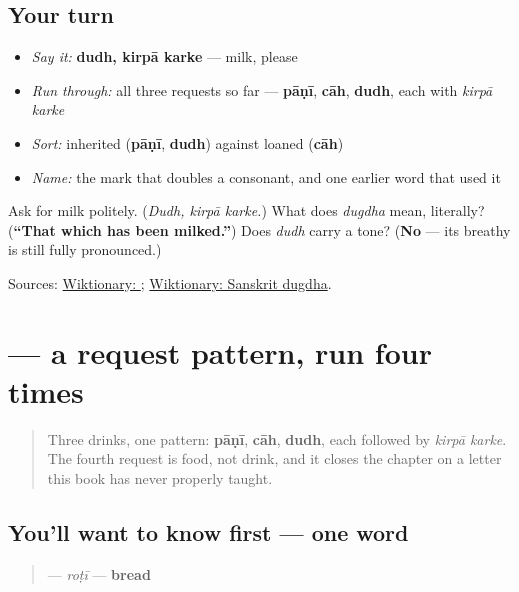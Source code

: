 \subsection*{Your turn}
\begin{itemize}
\raggedright
  \item \emph{Say it:} \textbf{dudh, kirpā karke} — milk, please
  \item \emph{Run through:} all three requests so far — \textbf{pāṇī}, \textbf{cāh}, \textbf{dudh}, each with \emph{kirpā karke}
  \item \emph{Sort:} inherited (\textbf{pāṇī}, \textbf{dudh}) against loaned (\textbf{cāh})
  \item \emph{Name:} the mark that doubles a consonant, and one earlier word that used it
\end{itemize}

\begin{tcolorbox}[breakable,colback=teal!4,colframe=teal!35!black,title={Before you move on}]
Ask for milk politely. (\emph{Dudh, kirpā karke.}) What does \emph{dugdha} mean, literally? (\textbf{\textquotedblleft{}That which has been milked.\textquotedblright{}}) Does \emph{dudh} carry a tone? (\textbf{No} — its breathy \textbf{} is still fully pronounced.)

Sources: \href{https://en.wiktionary.org/wiki/\%E0\%A8\%A6\%E0\%A9\%81\%E0\%A9\%B1\%E0\%A8\%A7}{Wiktionary: }; \href{https://en.wiktionary.org/wiki/\%E0\%A4\%A6\%E0\%A5\%81\%E0\%A4\%97\%E0\%A5\%8D\%E0\%A4\%A7}{Wiktionary: Sanskrit dugdha}.
\end{tcolorbox}
\section[\texorpdfstring{\pa{ਰੋਟੀ} (roṭī)}{ਰੋਟੀ (roṭī)}]{ — a request pattern, run four times}

\label{lesson:PA-C10-roti}



\begin{quote}
Three drinks, one pattern: \textbf{pāṇī}, \textbf{cāh}, \textbf{dudh}, each followed by \emph{kirpā karke}. The fourth request is food, not drink, and it closes the chapter on a letter this book has never properly taught.
\end{quote}

\subsection*{You'll want to know first — one word}
\begin{quote}
\textbf{} — \emph{roṭī} — \textbf{bread}
\end{quote}

